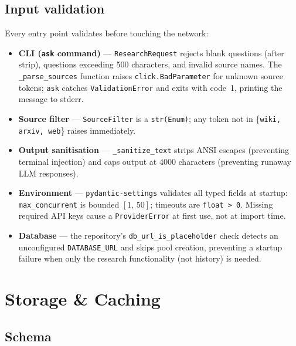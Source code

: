 \documentclass[11pt,a4paper]{article}
\begin{document}
\subsection{Input validation}

Every entry point validates before touching the network:

\begin{itemize}[itemsep=2pt]
  \item \textbf{CLI (\texttt{ask} command)} --- \texttt{ResearchRequest} rejects blank
    questions (after strip), questions exceeding 500 characters, and invalid source
    names. The \texttt{\_parse\_sources} function raises \texttt{click.BadParameter}
    for unknown source tokens; \texttt{ask} catches \texttt{ValidationError} and exits
    with code~1, printing the message to stderr.

  \item \textbf{Source filter} --- \texttt{SourceFilter} is a \texttt{str(Enum)};
    any token not in \{\texttt{wiki, arxiv, web}\} raises immediately.

  \item \textbf{Output sanitisation} --- \texttt{\_sanitize\_text} strips ANSI escapes
    (preventing terminal injection) and caps output at 4000 characters (preventing
    runaway LLM responses).

  \item \textbf{Environment} --- \texttt{pydantic-settings} validates all typed fields
    at startup: \texttt{max\_concurrent} is bounded $[1,\,50]$; timeouts are
    \texttt{float > 0}. Missing required API keys cause a \texttt{ProviderError} at
    first use, not at import time.

  \item \textbf{Database} --- the repository's \texttt{db\_url\_is\_placeholder} check
    detects an unconfigured \texttt{DATABASE\_URL} and skips pool creation, preventing
    a startup failure when only the research functionality (not history) is needed.
\end{itemize}

\section{Storage \& Caching}\label{sec:storage}

\subsection{Schema}
\end{document}

